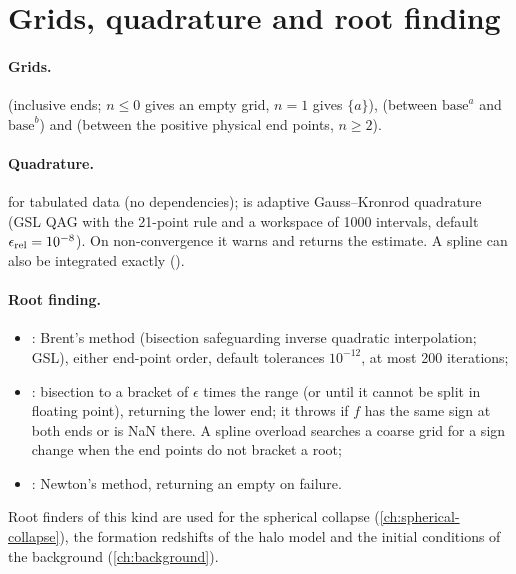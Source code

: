 \section{Grids, quadrature and root finding}\label{sec:num-quadrature}

\paragraph*{Grids.}  (inclusive ends; $n\le0$ gives an empty grid, $n=1$ gives $\{a\}$),
 (between $\mathrm{base}^a$ and $\mathrm{base}^b$) and  (between the
positive physical end points, $n\ge2$).

\paragraph*{Quadrature.}  for tabulated data (no dependencies);  is adaptive Gauss--Kronrod quadrature (GSL QAG with the 21-point rule and a workspace of 1000 intervals, default
$\epsilon_{\rm rel}=10^{-8}$). On non-convergence it warns and returns the estimate. A spline can also be integrated
exactly ().

\paragraph*{Root finding.}
\begin{itemize}
\item {}: Brent's method \cite{Brent1971} (bisection safeguarding inverse quadratic interpolation;
      GSL), either end-point order, default tolerances $10^{-12}$, at most 200 iterations;
\item {}: bisection to a bracket of $\epsilon$ times the range (or until it cannot
      be split in floating point), returning the lower end; it throws if $f$ has the same sign at both ends or is NaN there.
      A spline overload searches a coarse grid for a sign change when the end points do not bracket a root;
\item {}: Newton's method, returning an empty  on failure.
\end{itemize}
Root finders of this kind are used for the spherical collapse (\cref{ch:spherical-collapse}), the formation redshifts of
the halo model and the initial conditions of the background (\cref{ch:background}).

